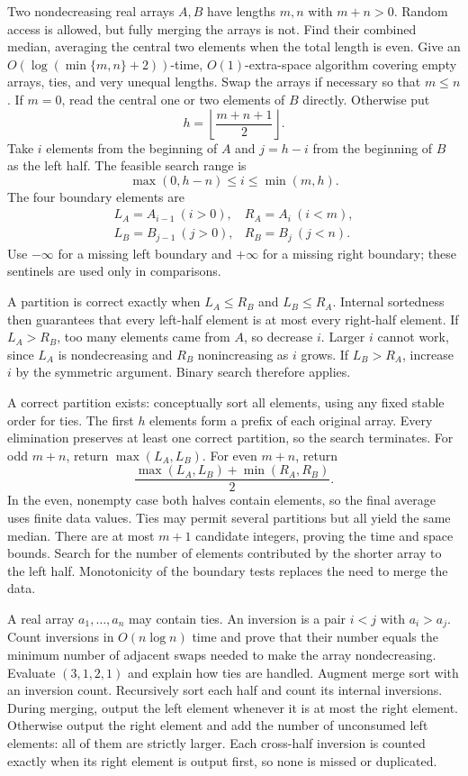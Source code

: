 Two nondecreasing real arrays $A,B$ have lengths $m,n$ with $m+n>0$. Random access is allowed, but fully merging the arrays is not. Find their combined median, averaging the central two elements when the total length is even. Give an $O(\log(\min\{m,n\}+2))$-time, $O(1)$-extra-space algorithm covering empty arrays, ties, and very unequal lengths.
\solution Swap the arrays if necessary so that $m\le n$. If $m=0$, read the central one or two elements of $B$ directly. Otherwise put
\[
h=\left\lfloor\frac{m+n+1}{2}\right\rfloor.
\]
Take $i$ elements from the beginning of $A$ and $j=h-i$ from the beginning of $B$ as the left half. The feasible search range is
\[
\max(0,h-n)\le i\le\min(m,h).
\]
The four boundary elements are
\[
\begin{array}{ll}
L_A=A_{i-1}\ (i>0),&R_A=A_i\ (i<m),\\
L_B=B_{j-1}\ (j>0),&R_B=B_j\ (j<n).
\end{array}
\]
Use $-\infty$ for a missing left boundary and $+\infty$ for a missing right boundary; these sentinels are used only in comparisons.

A partition is correct exactly when $L_A\le R_B$ and $L_B\le R_A$. Internal sortedness then guarantees that every left-half element is at most every right-half element. If $L_A>R_B$, too many elements came from $A$, so decrease $i$. Larger $i$ cannot work, since $L_A$ is nondecreasing and $R_B$ nonincreasing as $i$ grows. If $L_B>R_A$, increase $i$ by the symmetric argument. Binary search therefore applies.

A correct partition exists: conceptually sort all elements, using any fixed stable order for ties. The first $h$ elements form a prefix of each original array. Every elimination preserves at least one correct partition, so the search terminates. For odd $m+n$, return $\max(L_A,L_B)$. For even $m+n$, return
\[
\frac{\max(L_A,L_B)+\min(R_A,R_B)}2.
\]
In the even, nonempty case both halves contain elements, so the final average uses finite data values. Ties may permit several partitions but all yield the same median. There are at most $m+1$ candidate integers, proving the time and space bounds.
\insight Search for the number of elements contributed by the shorter array to the left half. Monotonicity of the boundary tests replaces the need to merge the data.

A real array $a_1,\ldots,a_n$ may contain ties. An inversion is a pair $i<j$ with $a_i>a_j$. Count inversions in $O(n\log n)$ time and prove that their number equals the minimum number of adjacent swaps needed to make the array nondecreasing. Evaluate $(3,1,2,1)$ and explain how ties are handled.
\solution Augment merge sort with an inversion count. Recursively sort each half and count its internal inversions. During merging, output the left element whenever it is at most the right element. Otherwise output the right element and add the number of unconsumed left elements: all of them are strictly larger. Each cross-half inversion is counted exactly when its right element is output first, so none is missed or duplicated.

